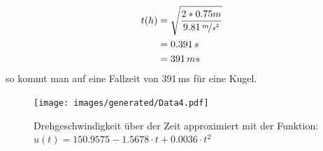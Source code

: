 \begin{align}
t(h) &= \sqrt{\frac{2 * 0.75m}{9.81\,\nicefrac{m}{s^2}}} \\
	 &= 0.391\,s \\
	 &= 391\,ms
\end{align}
so kommt man auf eine Fallzeit von 391\,ms für eine Kugel.



\begin{figure}[hb] \centering
	\texttt{[image: images/generated/Data4.pdf]}
	\caption{Drehgeschwindigkeit über der Zeit approximiert mit der Funktion: \newline $u(t) = 150.9575 - 1.5678\cdot t + 0.0036 \cdot t^2$}
\end{figure}

